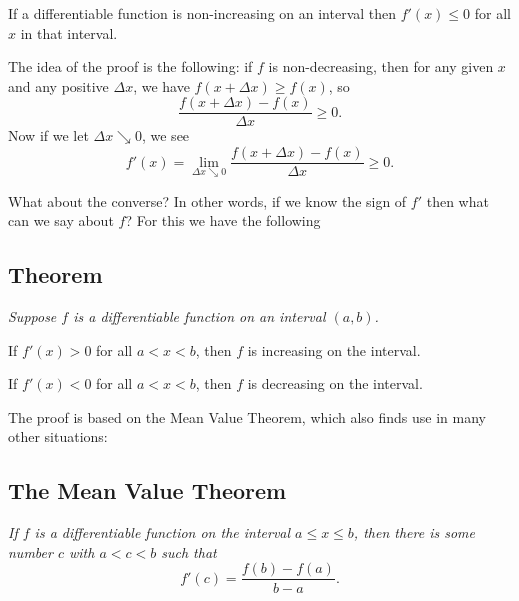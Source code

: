 If a differentiable function is non-increasing on an interval then $f'(x)\leq 0$
for all $x$ in that interval.  \upshape

The idea of the proof is the following: if $f$ is non-decreasing, then for any given $x$ and any positive
$\Delta x$, we have $f(x+ \Delta x)\geq f(x)$, so
\[
\frac{f(x+ \Delta x)-f(x)}{\Delta x} \geq 0.
\]
Now if we let $\Delta x\searrow 0$, we see
\[
f'(x) = \lim_{\Delta x\searrow0}\frac{f(x+ \Delta x)-f(x)}{\Delta x} \geq 0.
\]


What about the converse?  In other words, if we know the sign of $f'$ then what can we
say about $f$?  For this we have the following
\subsection{Theorem} %
\label{thm:deriv-pos-implies-increasing}\itshape
Suppose $f$ is a differentiable function on an interval $(a,b)$.

If $f'(x)>0$ for all $a<x<b$, then $f$ is increasing on the interval.

If $f'(x)<0$ for all $a<x<b$, then $f$ is decreasing on the interval.\upshape
\medskip




The proof is based on the Mean Value Theorem, which also finds use in
many other situations:
\subsection{The Mean Value Theorem} %
\itshape
If $f$ is a differentiable function on the interval $a\leq x\leq b$,
then there is some number $c$ with $a<c<b$ such that
\[
f'(c) = \frac{f(b)-f(a)}{b-a}.
\]
\upshape




